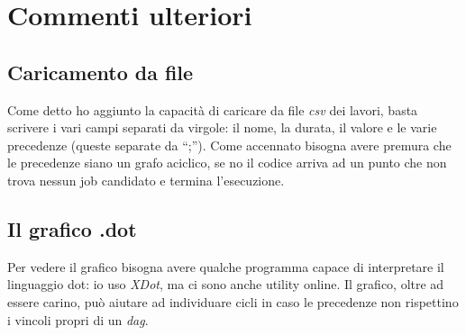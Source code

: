 \documentclass[12pt, letterpaper]{article}
\begin{document}
\section{Commenti ulteriori}

\subsection{Caricamento da file}
Come detto ho aggiunto la capacità di caricare da file \textit{csv} dei lavori, basta scrivere i vari campi separati da virgole: il nome, la durata, il valore e le varie precedenze (queste separate da ``;'').
Come accennato bisogna avere premura che le precedenze siano un grafo aciclico, se no il codice arriva ad un punto che non trova nessun job candidato e termina l'esecuzione.
\subsection{Il grafico .dot}
Per vedere il grafico bisogna avere qualche programma capace di interpretare il linguaggio dot: io uso \textit{XDot}, ma ci sono anche utility online.
Il grafico, oltre ad essere carino, può aiutare ad individuare cicli in caso le precedenze non rispettino i vincoli propri di un \textit{dag}.

\printbibliography
\end{document}
